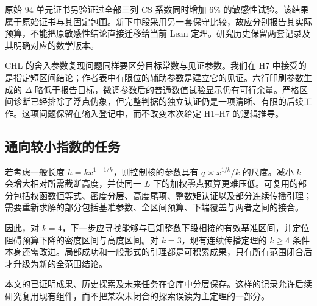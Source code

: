 原始 $94$ 单元证书另验证过全部三列 CS 系数同时增加 $6\%$ 的敏感性试验。该结果属于原始证书与其固定包围。新下中段采用另一套保守比较，故应分别报告其实际预算，不能把原敏感性结论直接迁移给当前 Lean 定理。研究历史保留两套记录及其明确对应的数学版本。

CHL 的舍入参数复现问题同样要区分目标常数与见证参数。我们在 H7 中接受的是指定短区间结论；作者表中有限位的辅助参数是建立它的见证。六行印刷参数生成的 $\Delta$ 略低于报告目标，微调参数后的普通数值试验显示仍有可行余量。严格区间诊断已经排除了浮点伪象，但完整判据的独立认证仍是一项清晰、有限的后续工作。这项问题保留在输入登记中，而不改变本次给定 H1--H7 的逻辑推导。

\subsection{通向较小指数的任务}
若考虑一般长度 $h=kx^{1-1/k}$，则控制核的参数具有 $q\asymp x^{1/k}/k$ 的尺度。减小 $k$ 会增大相对所需截断高度，并使同一 $L$ 下的加权零点预算更难压低。可复用的部分包括权函数恒等式、密度分层、高度尾项、整数矩认证以及部分连续传播引理；需要重新求解的部分包括基准参数、全区间预算、下端覆盖与两者之间的接合。

因此，对 $k=4$，下一步应寻找能够与已知整数下段相接的有效基准区间，并定位阻碍预算下降的密度区间与高度区间。对 $k=3$，现有连续传播定理的 $k\ge4$ 条件本身还需改进。局部成功和一般形式的引理都是可积累成果，只有所有范围闭合后才升级为新的全范围结论。

本文的已证明成果、历史探索及未来任务在仓库中分层保存。这样的记录允许后续研究复用现有组件，而不把某次未闭合的探索误读为主定理的一部分。
